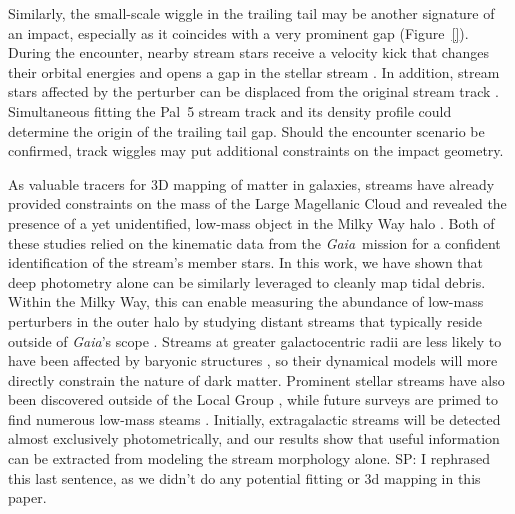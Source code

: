 \documentclass[twocolumn]{aastex62}
\newcommand{\gaia}{\textsl{Gaia}}
\newcommand{\sa}[1]{{\color{magenta} SP: #1}}
\begin{document}
Similarly, the small-scale wiggle in the trailing tail may be another signature of an impact, especially as it coincides with a very prominent gap (Figure~\ref{}).
During the encounter, nearby stream stars receive a velocity kick that changes their orbital energies and opens a gap in the stellar stream \citep[e.g.,][]{Erkal:2015b}.
In addition, stream stars affected by the perturber can be displaced from the original stream track \citep{Bonaca:2018b}.
Simultaneous fitting the Pal~5 stream track and its density profile could determine the origin of the trailing tail gap.
Should the encounter scenario be confirmed, track wiggles may put additional constraints on the impact geometry.



As valuable tracers for 3D mapping of matter in galaxies, streams have already provided constraints on the mass of the Large Magellanic Cloud \citep{Erkal:2019} and revealed the presence of a yet unidentified, low-mass object in the Milky Way halo \citep{Bonaca:2018b}.
Both of these studies relied on the kinematic data from the \gaia\ mission for a confident identification of the stream's member stars.
In this work, we have shown that deep photometry alone can be similarly leveraged to cleanly map tidal debris.
Within the Milky Way, this can enable measuring the abundance of low-mass perturbers in the outer halo by studying distant streams that typically reside outside of \gaia's scope \citep[cf.][]{Ibata:2019}.
Streams at greater galactocentric radii are less likely to have been affected by baryonic structures \citep[e.g.,][]{Banik:2019}, so their dynamical models will more directly constrain the nature of dark matter.
Prominent stellar streams have also been discovered outside of the Local Group \citep[e.g.,][]{Martinez-Delgado:2010, Kado-Fong:2018}, while future surveys are primed to find numerous low-mass steams \citep{Pearson:2019}. 
Initially, extragalactic streams will be detected almost exclusively photometrically, and our results show that useful information can be extracted from modeling the stream morphology alone. 
\sa{I rephrased this last sentence, as we didn't do any potential fitting or 3d mapping in this paper. }
\end{document}
